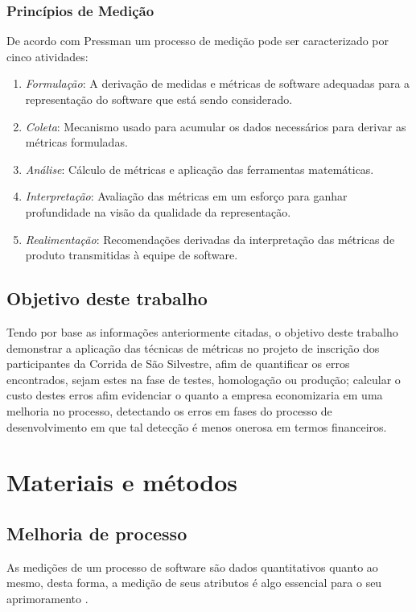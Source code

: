 \documentclass[11pt, a4paper]{article}
\begin{document}
\subsubsection{Princípios de Medição}
De acordo com Pressman um processo de medição pode ser caracterizado por cinco atividades:

\begin{enumerate}
	\item \textit{Formulação}: A derivação de medidas e métricas de software adequadas para a representação do software que está sendo considerado.
	\item \textit{Coleta}: Mecanismo usado para acumular os dados necessários para derivar as métricas formuladas.
	\item \textit{Análise}: Cálculo de métricas e aplicação das ferramentas matemáticas.
	\item \textit{Interpretação}: Avaliação das métricas em um esforço para ganhar profundidade na visão da qualidade da representação.
	\item \textit{Realimentação}: Recomendações derivadas da interpretação das métricas de produto transmitidas à equipe de software.
\end{enumerate}
\cite[p.353]{pressman}

\subsection{Objetivo deste trabalho}
Tendo por base as informações anteriormente citadas, o objetivo deste trabalho demonstrar a aplicação das técnicas de métricas no projeto de inscrição dos participantes da Corrida de São Silvestre, afim de quantificar os erros encontrados, sejam estes na fase de testes, homologação ou produção; calcular o custo destes erros afim evidenciar o quanto a empresa economizaria em uma melhoria no processo, detectando os erros em fases do processo de desenvolvimento em que tal detecção é menos onerosa em termos financeiros.


\section{Materiais e métodos}

\subsection{Melhoria de processo}
As medições de um processo de software são dados quantitativos quanto ao mesmo, desta forma, a medição de seus atributos é algo essencial para o seu aprimoramento \cite[p.446]{sommerville}.
\end{document}
